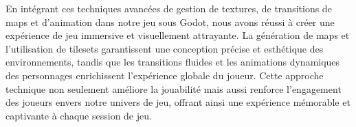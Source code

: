 En intégrant ces techniques avancées de gestion de textures, de transitions de maps et d'animation dans notre jeu sous Godot, nous avons réussi à créer une expérience de jeu immersive et visuellement attrayante. 
La génération de maps et l'utilisation de tilesets garantissent une conception précise et esthétique des environnements, tandis que les transitions fluides et les animations dynamiques des personnages enrichissent l'expérience globale du joueur. 
Cette approche technique non seulement améliore la jouabilité mais aussi renforce l'engagement des joueurs envers notre univers de jeu, offrant ainsi une expérience mémorable et captivante à chaque session de jeu.

